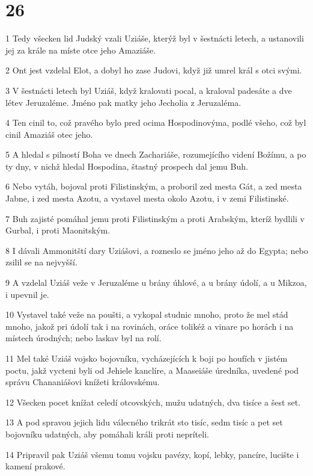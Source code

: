 \chapter{26}

\par 1 Tedy všecken lid Judský vzali Uziáše, kterýž byl v šestnácti letech, a ustanovili jej za krále na míste otce jeho Amaziáše.
\par 2 Ont jest vzdelal Elot, a dobyl ho zase Judovi, když již umrel král s otci svými.
\par 3 V šestnácti letech byl Uziáš, když kralovati pocal, a kraloval padesáte a dve létev Jeruzaléme. Jméno pak matky jeho Jecholia z Jeruzaléma.
\par 4 Ten cinil to, což pravého bylo pred ocima Hospodinovýma, podlé všeho, což byl cinil Amaziáš otec jeho.
\par 5 A hledal s pilností Boha ve dnech Zachariáše, rozumejícího videní Božímu, a po ty dny, v nichž hledal Hospodina, štastný prospech dal jemu Buh.
\par 6 Nebo vytáh, bojoval proti Filistinským, a proboril zed mesta Gát, a zed mesta Jabne, i zed mesta Azotu, a vystavel mesta okolo Azotu, i v zemi Filistinské.
\par 7 Buh zajisté pomáhal jemu proti Filistinským a proti Arabským, kteríž bydlili v Gurbal, i proti Maonitským.
\par 8 I dávali Ammonitští dary Uziášovi, a rozneslo se jméno jeho až do Egypta; nebo zsilil se na nejvyšší.
\par 9 A vzdelal Uziáš veže v Jeruzaléme u brány úhlové, a u brány údolí, a u Mikzoa, i upevnil je.
\par 10 Vystavel také veže na poušti, a vykopal studnic mnoho, proto že mel stád mnoho, jakož pri údolí tak i na rovinách, oráce tolikéž a vinare po horách i na místech úrodných; nebo laskav byl na rolí.
\par 11 Mel také Uziáš vojsko bojovníku, vycházejících k boji po houfích v jistém poctu, jakž vycteni byli od Jehiele kanclíre, a Maaseiáše úredníka, uvedené pod správu Chananiášovi knížeti královskému.
\par 12 Všecken pocet knížat celedí otcovských, mužu udatných, dva tisíce a šest set.
\par 13 A pod spravou jejich lidu válecného trikrát sto tisíc, sedm tisíc a pet set bojovníku udatných, aby pomáhali králi proti nepríteli.
\par 14 Pripravil pak Uziáš všemu tomu vojsku pavézy, kopí, lebky, pancíre, lucište i kamení prakové.
